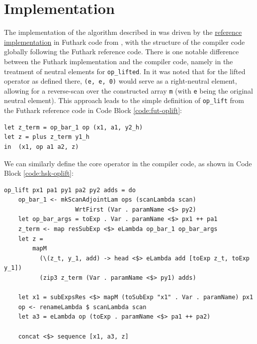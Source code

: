 \documentclass{article}
\newenvironment{code}{\captionsetup{type=listing}}{}
\begin{document}
\section{Implementation}
The implementation of the algorithm described in \cite{PPAD} was driven by the \href{https://github.com/diku-dk/ifl23-revad-red-scan/blob/main/scan/scan-adj-comp.fut}{reference implementation} in Futhark code from \cite{Futhark}, with the structure of the compiler code globally following the Futhark reference code. There is one notable difference between the Futhark implementation and the compiler code, namely in the treatment of neutral elements for \lstinline{op_lifted}. In \cite{PPAD} it was noted that for the lifted operator as defined there, \lstinline{(e, e, 0)} would serve as a right-neutral element, allowing for a reverse-scan over the constructed array \lstinline{m} (with \lstinline{e} being the original neutral element). This approach leads to the simple definition of \lstinline{op_lift} from the Futhark reference code in Code Block \ref{code:fut-oplift}:
\begin{code}
	\begin{verbatim}
let z_term = op_bar_1 op (x1, a1, y2_h)
let z = plus z_term y1_h
in  (x1, op a1 a2, z)
\end{verbatim}
	\caption{Reference Futhark code for \lstinline{op_lift} (operator for scan calculating adjoints for scan intermediates rs/xs). \lstinline{op_bar_1} refers to differentiating \lstinline{op} with respect to its first argument.\\}
	\label{code:fut-oplift}
\end{code}
We can similarly define the core operator in the compiler code, as shown in Code Block \ref{code:hsk-oplift}:
\begin{code}
	\begin{verbatim}
op_lift px1 pa1 py1 pa2 py2 adds = do
    op_bar_1 <- mkScanAdjointLam ops (scanLambda scan) 
                    WrtFirst (Var . paramName <$> py2)
    let op_bar_args = toExp . Var . paramName <$> px1 ++ pa1
    z_term <- map resSubExp <$> eLambda op_bar_1 op_bar_args
    let z =
        mapM
          (\(z_t, y_1, add) -> head <$> eLambda add [toExp z_t, toExp y_1])
          (zip3 z_term (Var . paramName <$> py1) adds)
    
    let x1 = subExpsRes <$> mapM (toSubExp "x1" . Var . paramName) px1
    op <- renameLambda $ scanLambda scan
    let a3 = eLambda op (toExp . paramName <$> pa1 ++ pa2)
    
    concat <$> sequence [x1, a3, z]
\end{verbatim}
	\caption{Haskell code for \lstinline{op_lift} (operator for scan calculating adjoints for scan intermediates rs/xs).\\}
	\label{code:hsk-oplift}
\end{code}
\end{document}
